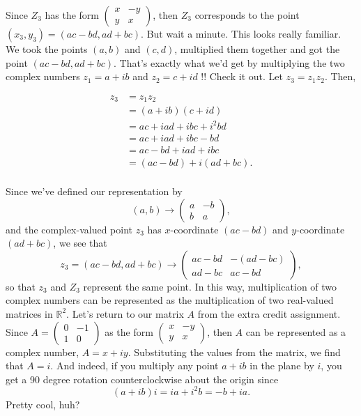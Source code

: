 \documentclass{article}
\begin{document}
Since $Z_3$ has the form $\begin{pmatrix}x & -y\\y & x\end{pmatrix}$, then $Z_3$ corresponds to the point $\left(x_3, y_3\right) = \left(ac - bd, ad + bc \right)$. But wait a minute. This looks really familiar. We took the points $\left(a, b\right)$ and $\left(c, d\right)$, multiplied them together and got the point $\left( ac - bd, ad + bc\right)$. That's exactly what we'd get by multiplying the two complex numbers $z_1 = a + ib$ and $z_2 = c + id$ !! Check it out. Let $z_3 = z_1 z_2$. Then,

\begin{align*}
z_3 &= z_1 z_2\\
&= \left(a + ib\right)\left(c + id\right)\\
&= ac + iad + ibc + i^2bd\\
&= ac + iad + ibc - bd\\
&= ac - bd + iad + ibc\\
&= \left(ac - bd\right) + i\left(ad + bc\right).\\
\end{align*}

Since we've defined our representation by $$\left(a, b\right) \rightarrow \begin{pmatrix}a & -b\\b & a\end{pmatrix},$$ and the complex-valued point $z_3$ has $x$-coordinate $\left(ac - bd\right)$ and $y$-coordinate $\left( ad + bc\right)$, we see that $$z_3 = \left(ac - bd, ad+ bc\right) \rightarrow \begin{pmatrix}ac - bd & -\left(ad - bc\right)\\ad - bc & ac - bd\end{pmatrix},$$ so that $z_3$ and $Z_3$ represent the same point. In this way, multiplication of two complex numbers can be represented as the multiplication of two real-valued matrices in $\mathbb{R}^2$. Let's return to our matrix $A$ from the extra credit assignment.\\

Since $A = \begin{pmatrix}0 & -1 \\ 1 & 0\end{pmatrix}$ as the form $\begin{pmatrix}x & -y \\ y & x\end{pmatrix}$, then $A$ can be represented as a complex number, $A = x + iy$. Substituting the values from the matrix, we find that $A = i.$ And indeed, if you multiply any point $a + ib$ in the plane by $i$, you get a 90 degree rotation counterclockwise about the origin since $$\left(a + ib\right)i = ia + i^2b = -b + ia.$$ 
Pretty cool, huh?
\end{document}
